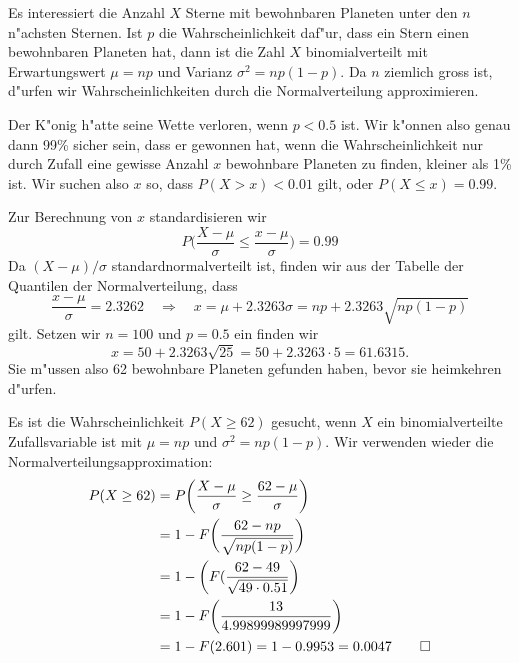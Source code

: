 \begin{loesung}
\begin{teilaufgaben}
\item
Es interessiert die Anzahl $X$ Sterne mit bewohnbaren Planeten
unter den $n$ n"achsten Sternen.
Ist $p$ die  Wahrscheinlichkeit daf"ur, dass ein Stern einen bewohnbaren
Planeten hat, dann ist die Zahl $X$ binomialverteilt mit Erwartungswert
$\mu=np$ und Varianz $\sigma^2=np(1-p)$. Da $n$ ziemlich gross ist, d"urfen wir
Wahrscheinlichkeiten durch die Normalverteilung approximieren.

Der K"onig h"atte seine Wette verloren, wenn $p<0.5$ ist. Wir k"onnen
also genau dann 99\% sicher sein, dass er gewonnen hat, wenn
die Wahrscheinlichkeit nur durch Zufall eine gewisse Anzahl $x$
bewohnbare Planeten zu finden, kleiner als 1\% ist.
Wir suchen also $x$ so, dass $P(X>x)<0.01$ gilt, oder $P(X\le x)=0.99$.

Zur Berechnung von $x$ standardisieren wir
\[
P\biggl(
\frac{X-\mu}{\sigma}\le \frac{x-\mu}{\sigma}
\biggr)
=0.99
\]
Da $(X-\mu)/\sigma$ standardnormalverteilt ist, finden wir aus
der Tabelle der Quantilen der Normalverteilung, dass
\[
\frac{x-\mu}{\sigma}=2.3262
\quad\Rightarrow\quad
x=\mu+2.3263\sigma=np+2.3263\sqrt{np(1-p)}
\]
gilt. Setzen wir $n=100$ und $p=0.5$ ein finden wir
\[
x=50 + 2.3263\sqrt{25}=50 + 2.3263\cdot 5=61.6315.
\]
Sie m"ussen also 62 bewohnbare Planeten gefunden haben, bevor sie heimkehren
d"urfen.

\item Es ist die Wahrscheinlichkeit
$P(X\ge 62)$ gesucht, wenn $X$ ein binomialverteilte Zufallsvariable
ist mit $\mu=np$ und $\sigma^2=np(1-p)$. Wir verwenden wieder die
Normalverteilungsapproximation:
\begin{align*}
P(X\ge 62)
&=
P\biggl(
\frac{X-\mu}{\sigma}\ge \frac{62-\mu}{\sigma}
\biggr)\\
&
=1-F\biggl(
\frac{62-np}{\sqrt{np(1-p)}}
\biggr)
\\
&
=1-\biggl(F(\frac{62-49}{\sqrt{49\cdot 0.51}}\biggr)
\\
&
=
1-F\biggl(\frac{13}{4.99899989997999}\biggr)
\\
&=1-F(2.601)=1-0.9953=0.0047
\qedhere
\end{align*}
\end{teilaufgaben}
\end{loesung}
